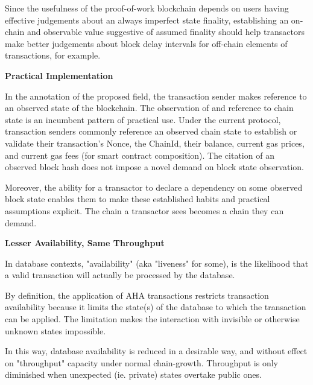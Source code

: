 \documentclass[11pt]{article}
\theoremstyle{plain}
\begin{document}
{Since the usefulness of the proof-of-work blockchain depends on users
having effective judgements about an always imperfect state finality, establishing an
on-chain and observable value suggestive of assumed finality should help
transactors make better judgements about block delay intervals for off-chain elements of transactions, for example.

\textbf{Practical Implementation}

In the annotation of the proposed field, the transaction sender makes reference to an observed state of the blockchain.
The observation of and reference to chain state is an incumbent pattern of practical use.
Under the current protocol, transaction senders commonly reference an observed chain state to
establish or validate their transaction's Nonce, the ChainId, their balance, current gas prices,
and current gas fees (for smart contract composition).
The citation of an observed block hash does not impose a novel demand on block state observation.

Moreover, the ability for a transactor to declare a dependency on some observed block state
enables them to make these established habits and practical assumptions explicit.
The chain a transactor sees becomes a chain they can demand.

\textbf{Lesser Availability, Same Throughput}

In database contexts, "availability" (aka "liveness" for some),
is the likelihood that a valid transaction will actually be processed by the database.

By definition, the application of AHA transactions restricts transaction availability
because it limits the state(s) of the database to which the transaction can be applied.
The limitation makes the interaction with invisible or otherwise unknown states impossible.

In this way, database availability is reduced in a desirable way, and without effect
on "throughput" capacity under normal chain-growth.
Throughput is only diminished when unexpected (ie. private) states overtake public ones.


%
%
%

}
\end{document}

